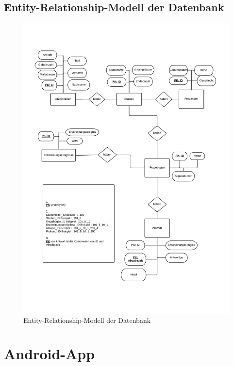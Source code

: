 \documentclass[a4paper]{scrreprt}
\begin{document}
{\begin{itemize}
            \end{itemize}
            
        

        \newpage
        \section{Entity-Relationship-Modell der Datenbank}
            \begin{figure}[H]
                \centering
                \includegraphics[scale = 0.6]{ERM.jpeg}
                \caption{Entity-Relationship-Modell der Datenbank}
            \end{figure}


    \newpage
    \chapter{Android-App}

}
\end{document}
